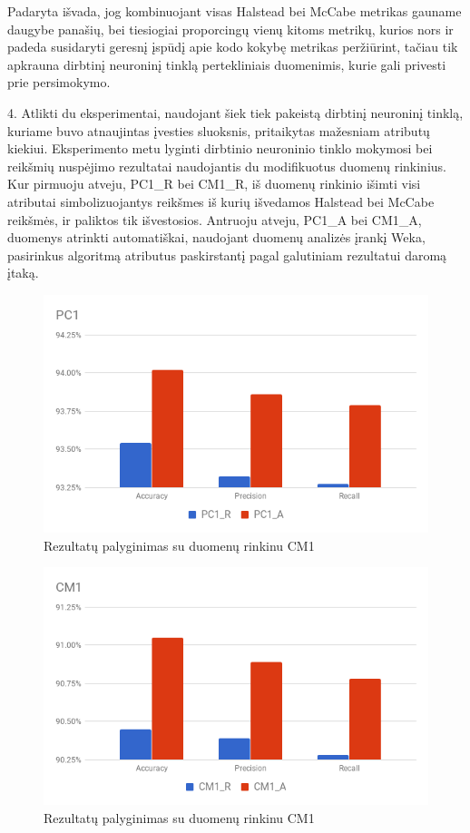 \documentclass{VUMIFPSbakalaurinis}
\begin{document}
Padaryta išvada, jog kombinuojant visas Halstead bei McCabe metrikas gauname daugybe panašių, bei tiesiogiai proporcingų vienų kitoms metrikų, kurios nors ir padeda susidaryti geresnį įspūdį apie kodo kokybę metrikas peržiūrint, tačiau tik apkrauna dirbtinį neuroninį tinklą pertekliniais duomenimis, kurie gali privesti prie persimokymo.

4. Atlikti du eksperimentai, naudojant šiek tiek pakeistą dirbtinį neuroninį tinklą, kuriame buvo atnaujintas įvesties sluoksnis, pritaikytas mažesniam atributų kiekiui. Eksperimento metu lyginti dirbtinio neuroninio tinklo mokymosi bei reikšmių nuspėjimo rezultatai naudojantis du modifikuotus duomenų rinkinius. Kur pirmuoju atveju, PC1\_R bei CM1\_R, iš duomenų rinkinio išimti visi atributai simbolizuojantys reikšmes iš kurių išvedamos Halstead bei McCabe reikšmės, ir paliktos tik išvestosios. Antruoju atveju, PC1\_A bei CM1\_A, duomenys atrinkti automatiškai, naudojant duomenų analizės įrankį Weka, pasirinkus algoritmą atributus paskirstantį pagal galutiniam rezultatui daromą įtaką.



\begin{figure}[H]
    \centering
    \includegraphics[scale=0.5]{img/chart-3}
    \caption{Rezultatų palyginimas su duomenų rinkinu CM1}
    \label{img:chart3}
\end{figure}

\begin{figure}[H]
    \centering
    \includegraphics[scale=0.5]{img/chart-4}
    \caption{Rezultatų palyginimas su duomenų rinkinu CM1}
    \label{img:chart4}
\end{figure}
\end{document}
